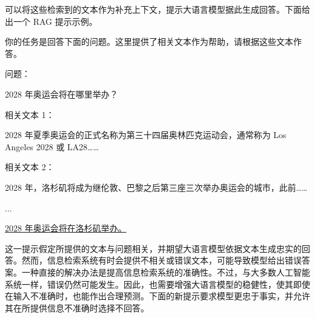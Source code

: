 可以将这些检索到的文本作为补充上下文，提示大语言模型据此生成回答。下面给出一个 RAG 提示示例。

\vspace{0.5em}
\begin{tcolorbox}

\begingroup
\setlength{\leftskip}{2em}
\setlength{\rightskip}{2em}

你的任务是回答下面的问题。这里提供了相关文本作为帮助，请根据这些文本作答。

\vspace{0.5em}

问题：

\vspace{0.2em}

2028 年奥运会将在哪里举办？

\vspace{0.5em}

相关文本 1：

\vspace{0.2em}

2028 年夏季奥运会的正式名称为第三十四届奥林匹克运动会，通常称为 Los Angeles 2028 或 LA28……

\vspace{0.5em}

相关文本 2：

2028 年，洛杉矶将成为继伦敦、巴黎之后第三座三次举办奥运会的城市，此前……

\vspace{0.2em}

...

\vspace{0.5em}

\underline{2028 年奥运会将在洛杉矶举办。}

\endgroup

\end{tcolorbox}
\vspace{0.5em}

这一提示假定所提供的文本与问题相关，并期望大语言模型依据文本生成忠实的回答。然而，信息检索系统有时会提供不相关或错误文本，可能导致模型给出错误答案。一种直接的解决办法是提高信息检索系统的准确性。不过，与大多数人工智能系统一样，错误仍然可能发生。因此，也需要增强大语言模型的稳健性，使其即使在输入不准确时，也能作出合理预测。下面的新提示要求模型更忠于事实，并允许其在所提供信息不准确时选择不回答。

